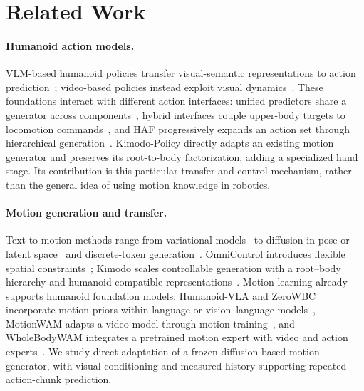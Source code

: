 \section{Related Work}
\label{sec:related_work}
\paragraph{Humanoid action models.}
VLM-based humanoid policies transfer visual-semantic representations to action prediction~\cite{grootn1,psi0,humanoidexo,openhlm}; video-based policies instead exploit visual dynamics~\cite{motionwam,wholebodywam_wbc}. These foundations interact with different action interfaces: unified predictors share a generator across components~\cite{openhlm,motionwam}, hybrid interfaces couple upper-body targets to locomotion commands~\cite{humanoidexo,wholebodyvla}, and HAF progressively expands an action set through hierarchical generation~\cite{haf}. Kimodo-Policy directly adapts an existing motion generator and preserves its root-to-body factorization, adding a specialized hand stage. Its contribution is this particular transfer and control mechanism, rather than the general idea of using motion knowledge in robotics.

\paragraph{Motion generation and transfer.}
Text-to-motion methods range from variational models~\cite{temos} to diffusion in pose or latent space~\cite{mdm,mld} and discrete-token generation~\cite{t2mgpt,momask}. OmniControl introduces flexible spatial constraints~\cite{omnicontrol}; Kimodo scales controllable generation with a root--body hierarchy and humanoid-compatible representations~\cite{kimodo}. Motion learning already supports humanoid foundation models: Humanoid-VLA and ZeroWBC incorporate motion priors within language or vision--language models~\cite{humanoidvla,zerowbc}, MotionWAM adapts a video model through motion training~\cite{motionwam}, and WholeBodyWAM integrates a pretrained motion expert with video and action experts~\cite{wholebodywam_motionpriors}. We study direct adaptation of a frozen diffusion-based motion generator, with visual conditioning and measured history supporting repeated action-chunk prediction.
